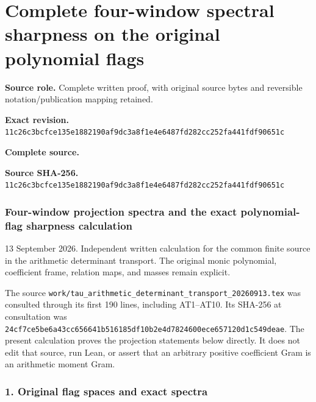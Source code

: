 \begingroup

\section{Complete four-window spectral sharpness on the original polynomial flags}


\begingroup
\sloppy
\small

\noindent\textbf{Source role.} Complete written proof, with original source bytes and reversible notation/publication mapping retained.\par
\noindent\textbf{Exact revision.} \nolinkurl{11c26c3bcfce135e1882190af9dc3a8f1e4e6487fd282cc252fa441fdf90651c}\par
\noindent\textbf{Complete source.} \par
\noindent\textbf{Source SHA-256.} \nolinkurl{11c26c3bcfce135e1882190af9dc3a8f1e4e6487fd282cc252fa441fdf90651c}\par\medskip
\subsubsection{Four-window projection spectra and the exact polynomial-flag sharpness calculation}\label{endpoint-four_window_sharpness--four-window-projection-spectra-and-the-exact-polynomial-flag-sharpness-calculation}

13 September 2026. Independent written calculation for the common finite source in the arithmetic determinant transport. The original monic polynomial, coefficient frame, relation maps, and masses remain explicit.

The source \nolinkurl{work/tau_arithmetic_determinant_transport_20260913.tex} was consulted through its first 190 lines, including AT1--AT10. Its SHA-256 at consultation was \nolinkurl{24cf7ce5be6a43cc656641b516185df10b2e4d7824600ece657120d1c549deae}. The present calculation proves the projection statements below directly. It does not edit that source, run Lean, or assert that an arbitrary positive coefficient Gram is an arithmetic moment Gram.

\subsubsection{1. Original flag spaces and exact spectra}\label{endpoint-four_window_sharpness--original-flag-spaces-and-exact-spectra}


